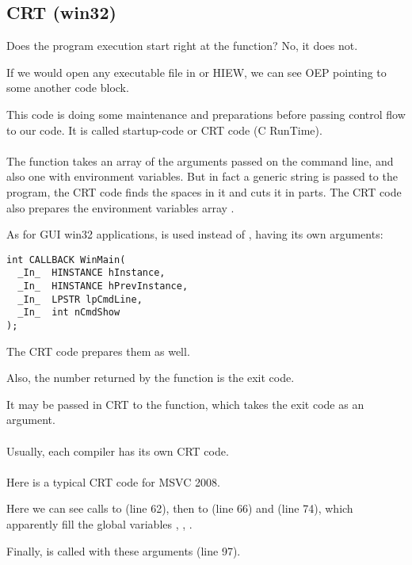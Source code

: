 \subsection{CRT (win32)}
\label{sec:CRT}

Does the program execution start right at the \main{} function?
No, it does not.

If we would open any executable file in \IDA or HIEW, 
we can see \ac{OEP} pointing to some another code block.

This code is doing some maintenance and preparations before passing control flow to our code.
It is called startup-code or CRT code (C RunTime). \\
\\
The \main{} function takes an array of the arguments passed on the command line, and also
one with environment variables.
But in fact a generic string is passed to the program,
the CRT code finds the spaces in it and cuts it in parts.
The CRT code also prepares the environment
variables array .

As for \ac{GUI} win32 applications,  is used instead of \main{}, having its own arguments:

\begin{lstlisting}[style=customc]
int CALLBACK WinMain(
  _In_  HINSTANCE hInstance,
  _In_  HINSTANCE hPrevInstance,
  _In_  LPSTR lpCmdLine,
  _In_  int nCmdShow
);
\end{lstlisting}

The CRT code prepares them as well.

Also, the number returned by the \main{} function is the exit code.

It may be passed in CRT to the  function, which takes the exit code as an argument. \\
\\
Usually, each compiler has its own CRT code. \\
\\
Here is a typical CRT code for MSVC 2008.



Here we can see calls to  (line 62),
then to  (line 66) and  (line 74),
which apparently fill the global variables
, , .

Finally, \main{} is called with these arguments (line 97).

